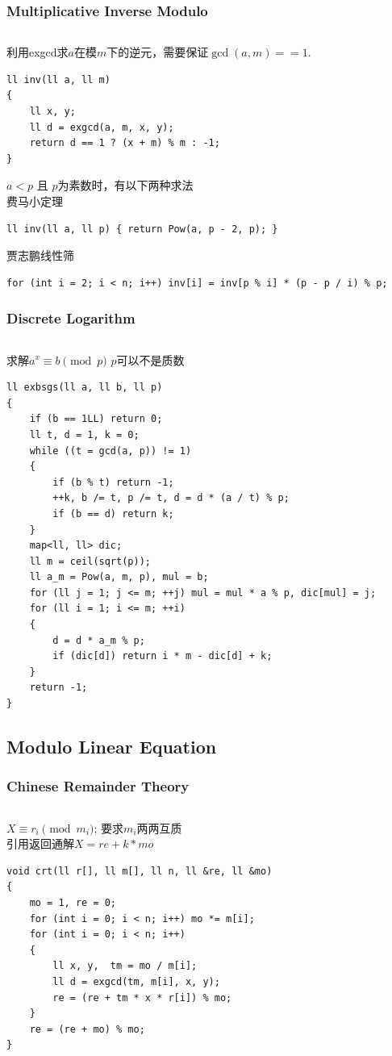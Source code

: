 \documentclass[twoside]{article}
\begin{document}
\subsubsection{Multiplicative Inverse Modulo}
\begin{lstlisting}
\end{lstlisting}
利用exgcd求$a$在模$m$下的逆元，需要保证$\gcd(a, m) == 1$.
\begin{lstlisting}
ll inv(ll a, ll m)
{
    ll x, y;
    ll d = exgcd(a, m, x, y);
    return d == 1 ? (x + m) % m : -1;
}
\end{lstlisting}
$a < p$ 且 $p$为素数时，有以下两种求法\\
费马小定理
\begin{lstlisting}
ll inv(ll a, ll p) { return Pow(a, p - 2, p); }
\end{lstlisting}
贾志鹏线性筛
\begin{lstlisting}
for (int i = 2; i < n; i++) inv[i] = inv[p % i] * (p - p / i) % p;
\end{lstlisting}
\subsubsection{Discrete Logarithm}
\begin{lstlisting}
\end{lstlisting}
求解$a ^ x \equiv b \pmod p$
$p$可以不是质数
\begin{lstlisting}
ll exbsgs(ll a, ll b, ll p)
{
    if (b == 1LL) return 0;
    ll t, d = 1, k = 0;
    while ((t = gcd(a, p)) != 1)
    {
        if (b % t) return -1;
        ++k, b /= t, p /= t, d = d * (a / t) % p;
        if (b == d) return k;
    }
    map<ll, ll> dic;
    ll m = ceil(sqrt(p));
    ll a_m = Pow(a, m, p), mul = b;
    for (ll j = 1; j <= m; ++j) mul = mul * a % p, dic[mul] = j;
    for (ll i = 1; i <= m; ++i)
    {
        d = d * a_m % p;
        if (dic[d]) return i * m - dic[d] + k;
    }
    return -1;
}\end{lstlisting}
\subsection{Modulo Linear Equation}
\subsubsection{Chinese Remainder Theory}
\begin{lstlisting}
\end{lstlisting}
$X \equiv r_i \pmod {m_i}$; 要求$m_i$两两互质\\
引用返回通解$X = re + k * mo$
\begin{lstlisting}
void crt(ll r[], ll m[], ll n, ll &re, ll &mo)
{
    mo = 1, re = 0;
    for (int i = 0; i < n; i++) mo *= m[i];
    for (int i = 0; i < n; i++)
    {
        ll x, y,  tm = mo / m[i];
        ll d = exgcd(tm, m[i], x, y);
        re = (re + tm * x * r[i]) % mo;
    }
    re = (re + mo) % mo;
}
\end{lstlisting}
\end{document}
